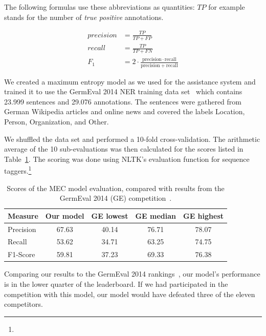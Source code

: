 		The following formulas use these abbreviations as quantities: \(TP\) for example stands for the number of \textit{true positive} annotations.

		\begin{align*}
			precision &= \frac{TP}{TP + FP} \\[0.5cm]
			recall &= \frac{TP}{TP + FN} \\[0.5cm]
			F_{1} &= 2 \cdot {\frac {\mathrm {precision} \cdot \mathrm {recall} }{\mathrm {precision} +\mathrm {recall} }}
		\end{align*}
		\vspace{0.25cm}

		We created a maximum entropy model as we used for the assistance system and trained it to use the GermEval 2014 \ac{NER} training data set~\cite{germEval2014ner} which contains 23.999 sentences and 29.076 annotations. The sentences were gathered from German Wikipedia articles and online news and covered the labels \lqq Location\rqq, \lqq Person\rqq, \lqq Organization\rqq, and \lqq Other\rqq.

		We shuffled the data set and performed a 10-fold cross-validation. The arithmetic average of the 10 sub-evaluations was then calculated for the scores listed in Table~\ref{tab:modelEval}. The scoring was done using \ac{NLTK}'s evaluation function for sequence taggers.\footnote{}

		\begin{table}[h]\centering
			\caption{Scores of the \acl{MEC} model evaluation, compared with results from the GermEval 2014 (GE) competition~\cite{benikova2014germeval}.}
			\begin{tabular}{lcccc}
				\toprule
				Measure & Our model & GE lowest & GE median & GE highest \\
				\midrule
				Precision & 67.63 & 40.14 & 76.71 & 78.07 \\
				Recall & 53.62 & 34.71 & 63.25 & 74.75 \\
				F1-Score & 59.81 & 37.23 & 69.33 & 76.38 \\
				\bottomrule
			\end{tabular}
			\label{tab:modelEval}
		\end{table}

		Comparing our results to the GermEval 2014 rankings~\cite{benikova2014germeval}, our model's performance is in the lower quarter of the leaderboard. If we had participated in the competition with this model, our model would have defeated three of the eleven competitors.

